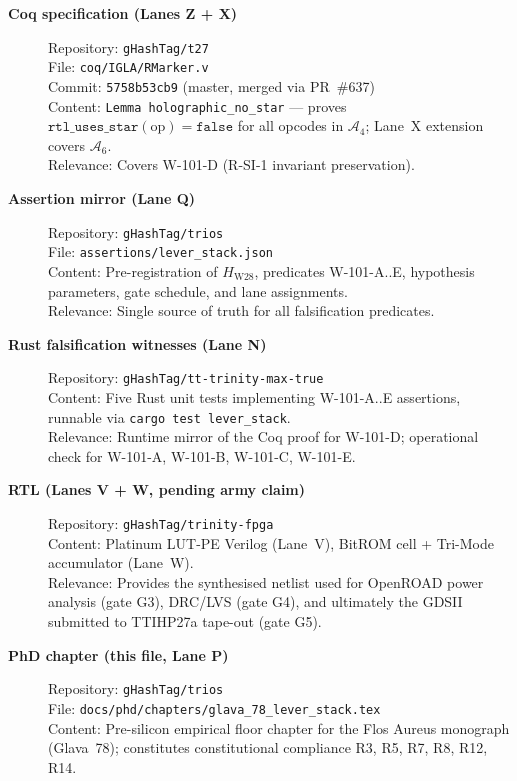 \begin{description}
  \item[\textbf{Coq specification (Lanes Z + X)}]
    Repository: \texttt{gHashTag/t27}\\
    File: \texttt{coq/IGLA/RMarker.v}\\
    Commit: \texttt{5758b53cb9} (master, merged via PR~\#637)\\
    Content: \texttt{Lemma holographic\_no\_star} — proves
    \(\mathtt{rtl\_uses\_star}(\mathrm{op}) = \mathtt{false}\) for all
    opcodes in \(\mathcal{A}_{4}\); Lane~X extension covers \(\mathcal{A}_{6}\).\\
    Relevance: Covers W-101-D (R-SI-1 invariant preservation).

  \item[\textbf{Assertion mirror (Lane Q)}]
    Repository: \texttt{gHashTag/trios}\\
    File: \texttt{assertions/lever\_stack.json}\\
    Content: Pre-registration of \(H_{\mathrm{W28}}\), predicates W-101-A..E,
    hypothesis parameters, gate schedule, and lane assignments.\\
    Relevance: Single source of truth for all falsification predicates.

  \item[\textbf{Rust falsification witnesses (Lane N)}]
    Repository: \texttt{gHashTag/tt-trinity-max-true}\\
    Content: Five Rust unit tests implementing W-101-A..E assertions,
    runnable via \texttt{cargo test lever\_stack}.\\
    Relevance: Runtime mirror of the Coq proof for W-101-D; operational
    check for W-101-A, W-101-B, W-101-C, W-101-E.

  \item[\textbf{RTL (Lanes V + W, pending army claim)}]
    Repository: \texttt{gHashTag/trinity-fpga}\\
    Content: Platinum LUT-PE Verilog (Lane~V), BitROM cell + Tri-Mode
    accumulator (Lane~W).\\
    Relevance: Provides the synthesised netlist used for OpenROAD power
    analysis (gate G3), DRC/LVS (gate G4), and ultimately the GDSII
    submitted to TTIHP27a tape-out (gate G5).

  \item[\textbf{PhD chapter (this file, Lane P)}]
    Repository: \texttt{gHashTag/trios}\\
    File: \texttt{docs/phd/chapters/glava\_78\_lever\_stack.tex}\\
    Content: Pre-silicon empirical floor chapter for the Flos Aureus
    monograph (Glava~78); constitutes constitutional compliance R3, R5, R7,
    R8, R12, R14.
\end{description}

